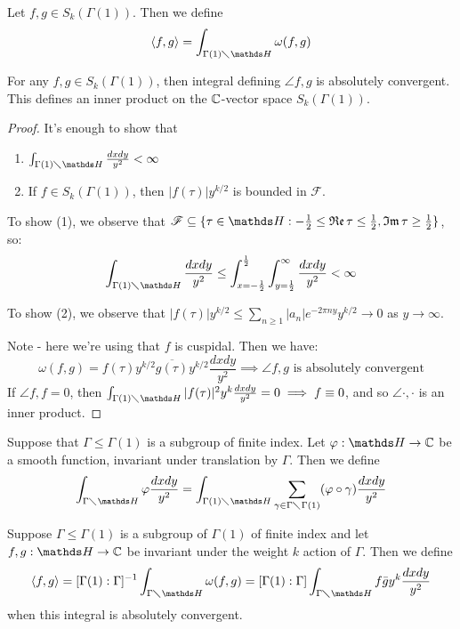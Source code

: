 \documentclass[10pt,a4paper]{article}
\begin{document}
\begin{definition}
  Let $f, g\in S_k(\Gamma(1))$. Then we define
  \[\angle{f, g} = \int_{\Gamma(1)\diagdown \H} \omega(f,g)\]
\end{definition}
\begin{lemma}
  For any $f, g \in S_k(\Gamma(1))$, then integral defining $\angle{f,g}$ is absolutely convergent. This defines an inner product on the $\mathbb{C}$-vector space $S_k(\Gamma(1))$.
\end{lemma}
\begin{proof}
  It's enough to show that
  \begin{enumerate}
    \item $\int_{\Gamma(1)\diagdown \H} \frac{dxdy}{y^2} < \infty$
    \item If $f \in S_k(\Gamma(1))$, then $|f(\tau)|y^{k/2}$ is bounded in $\mathscr{F}$.
  \end{enumerate}
  To show (1), we observe that $\mathscr{F} \subseteq \{\tau \in \H: -\frac12 \leq \Re \tau \leq \frac12, \Im \tau \geq \frac12\}$, so:
  \[\int_{\Gamma(1)\diagdown \H}\frac{dxdy}{y^2} \leq \int_{x=-\frac12}^\frac12 \int_{y=\frac12}^\infty \frac{dxdy}{y^2} < \infty\]

  To show (2), we observe that $|f(\tau)|y^{k/2} \leq \sum_{n\geq 1}|a_n|e^{-2\pi ny}y^{k/2} \to 0$ as $y \to \infty$.

  Note - here we're using that $f$ is cuspidal. Then we have:
  \[\omega(f,g) = f(\tau)y^{k/2} \overline{g(\tau)}y^{k/2} \frac{dxdy}{y^2} \implies \angle{f,g} \text{ is absolutely convergent}\]
  If $\angle{f,f} = 0$, then $\int_{\Gamma(1)\diagdown \H}|f(\tau)|^2 y^k \frac{dxdy}{y^2} = 0 \implies f \equiv 0$, and so $\angle{\cdot,\cdot}$ is an inner product.
\end{proof}
\begin{definition}
  Suppose that $\Gamma \leq \Gamma(1)$ is a subgroup of finite index. Let $\varphi: \H \to \C$ be a smooth function, invariant under translation by $\Gamma$. Then we define
  \[\int_{\Gamma \diagdown \H} \varphi \frac{dxdy}{y^2} = \int_{\Gamma(1)\diagdown \H} \sum_{\gamma \in \Gamma \diagdown \Gamma(1)}(\varphi \circ \gamma)\frac{dxdy}{y^2}\]
\end{definition}
\begin{definition}
  Suppose $\Gamma \leq \Gamma(1)$ is a subgroup of $\Gamma(1)$ of finite index and let $f, g:\H \to \C$ be invariant under the weight $k$ action of $\Gamma$. Then we define
  \[\angle{f,g} = [\Gamma(1):\Gamma]^{-1} \int_{\Gamma \diagdown \H}\omega(f,g) = [\Gamma(1):\Gamma]\int_{\Gamma \diagdown \H}f \bar{g}y^{k}\frac{dxdy}{y^2}\]
  when this integral is absolutely convergent.
\end{definition}
\end{document}
